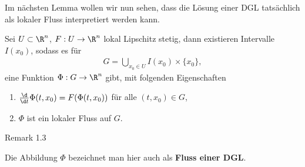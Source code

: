 \documentclass[letterpaper,10pt,english]{jupyterBook}
\begin{document}
Im nächsten Lemma wollen wir nun sehen, dass die Lösung einer DGL tatsächlich als lokaler Fluss interpretiert werden kann.
\label{ode/fluesse:lemma-3}
\begin{lemma}{}{}



Sei \(U\subset\R^n\), \(F:U \rightarrow \R^n\) lokal Lipschitz stetig, dann existieren Intervalle \(I(x_0)\), sodass es für
\begin{align*}
G = \bigcup_{x_0\in U} I(x_0)\times\{x_0\},
\end{align*}
eine Funktion \(\Phi:G\rightarrow \R^n\) gibt, mit folgenden Eigenschaften
\begin{enumerate}

\item {} 
\(\frac{\d}{\d t} \Phi(t, x_0) = F(\Phi(t, x_0))\) für alle \((t,x_0)\in G\),

\item {} 
\(\Phi\) ist ein lokaler Fluss auf \(G\).

\end{enumerate}
\end{lemma}
\label{ode/fluesse:remark-4}
\begin{emphBox}{}{}{Remark 1.3}



Die Abbildung \(\Phi\) bezeichnet man hier auch als \textbf{Fluss einer DGL}.
\end{emphBox}
\end{document}
